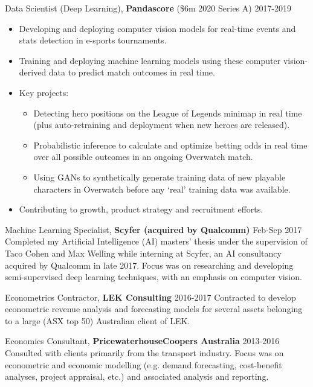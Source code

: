 \documentclass[margin]{res}
\begin{document}
\begin{resume}
		{Data Scientist (Deep Learning),} {\bf Pandascore} (\$6m 2020 Series A) \hfill 2017-2019
		\vspace{1mm}
		\begin{itemize}
			\item Developing and deploying computer vision models for real-time events and stats detection in e-sports tournaments.
			\item Training and deploying machine learning models using these computer vision-derived data to predict match outcomes in real time.
			\item Key projects:
			\begin{itemize}
				\item Detecting hero positions on the League of Legends minimap in real time (plus auto-retraining and deployment when new heroes are released).
				\item Probabilistic inference to calculate and optimize betting odds in real time over all possible outcomes in an ongoing Overwatch match.
				\item Using GANs to synthetically generate training data of new playable characters in Overwatch before any `real' training data was available.
			\end{itemize}
			\item Contributing to growth, product strategy and recruitment efforts.
		\end{itemize}
		
		{Machine Learning Specialist,} {\bf Scyfer (acquired by Qualcomm)} \hfill Feb-Sep 2017\vspace{1mm}\newline
		Completed my Artificial Intelligence (AI) masters' thesis under the supervision of Taco Cohen and Max Welling while interning at Scyfer, an AI consultancy acquired by Qualcomm in late 2017. Focus was on researching and developing semi-supervised deep learning techniques, with an emphasis on computer vision.
		
		{Econometrics Contractor,} {\bf LEK Consulting} \hfill 2016-2017\vspace{1mm}\newline
		Contracted to develop econometric revenue analysis and forecasting models for several assets belonging to a large (ASX top 50) Australian client of LEK.
		
		{Economics Consultant,} {\bf PricewaterhouseCoopers Australia} \hfill 2013-2016\vspace{1mm}\newline
		Consulted with clients primarily from the transport industry. Focus was on econometric and economic modelling (e.g. demand forecasting, cost-benefit analyses, project appraisal, etc.) and associated analysis and reporting.
		

\end{resume}
\end{document}
